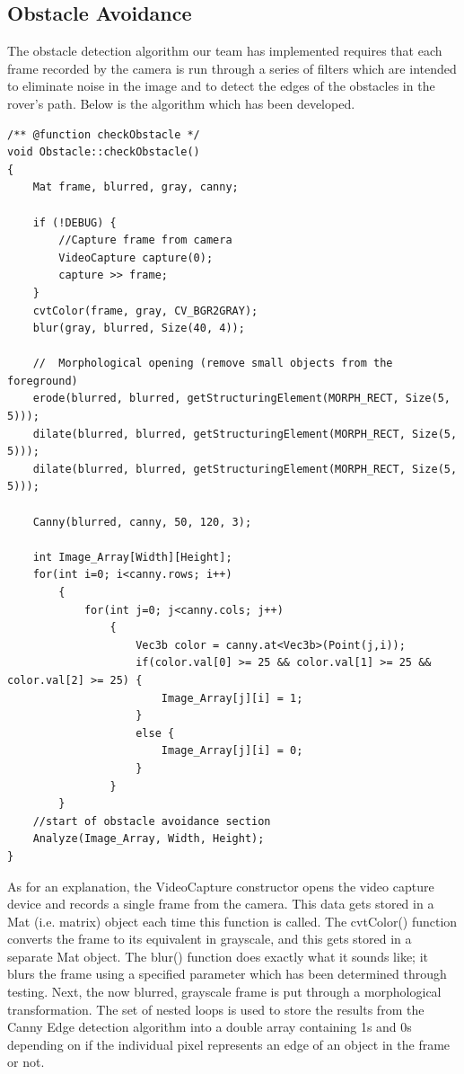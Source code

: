 \documentclass[10pt,letterpaper,onecolumn,draftclsnofoot,journal]{IEEEtran}
\begin{document}
\subsection{\textbf{Obstacle Avoidance}}
The obstacle detection algorithm our team has implemented requires that each frame recorded by the camera is run through a series of filters which are intended to eliminate noise in the image and to detect the edges of the obstacles in the rover's path. Below is the algorithm which has been developed.\vspace{.3cm}
\par
\begin{minipage}{\textwidth}
\begin{lstlisting}
/** @function checkObstacle */
void Obstacle::checkObstacle()
{
	Mat frame, blurred, gray, canny;

	if (!DEBUG) {
		//Capture frame from camera
		VideoCapture capture(0);
		capture >> frame;
	}
	cvtColor(frame, gray, CV_BGR2GRAY);
	blur(gray, blurred, Size(40, 4));

	//	Morphological opening (remove small objects from the foreground)
	erode(blurred, blurred, getStructuringElement(MORPH_RECT, Size(5, 5)));
	dilate(blurred, blurred, getStructuringElement(MORPH_RECT, Size(5, 5)));
	dilate(blurred, blurred, getStructuringElement(MORPH_RECT, Size(5, 5)));

	Canny(blurred, canny, 50, 120, 3);

	int Image_Array[Width][Height];
	for(int i=0; i<canny.rows; i++)
		{
			for(int j=0; j<canny.cols; j++)
				{
					Vec3b color = canny.at<Vec3b>(Point(j,i));
					if(color.val[0] >= 25 && color.val[1] >= 25 && color.val[2] >= 25) {
						Image_Array[j][i] = 1;
					}
					else {
						Image_Array[j][i] = 0;
					}
				}
		}
	//start of obstacle avoidance section
	Analyze(Image_Array, Width, Height);
}
\end{lstlisting}
\end{minipage}
\par
As for an explanation, the VideoCapture constructor opens the video capture device and records a single frame from the camera. This data gets stored in a Mat (i.e. matrix) object each time this function is called. The cvtColor() function converts the frame to its equivalent in grayscale, and this gets stored in a separate Mat object. The blur() function does exactly what it sounds like; it blurs the frame using a specified parameter which has been determined through testing. Next, the now blurred, grayscale frame is put through a morphological transformation. The set of nested loops is used to store the results from the Canny Edge detection algorithm into a double array containing 1s and 0s depending on if the individual pixel represents an edge of an object in the frame or not.
\end{document}
